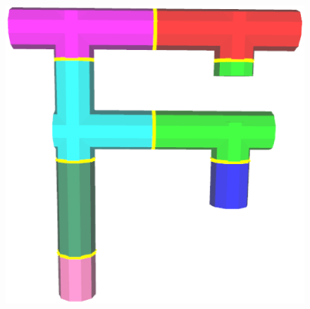 \begin{figure} [htbp]
{\begin{minipage}[b]{0.18\textwidth}
      \includegraphics[scale=0.13]{figs/f6.joinFP-F-init.eps}
    \end{minipage}}
\end{figure}
